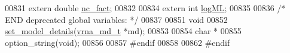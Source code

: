 \begin{DoxyCode}
00831 \textcolor{keyword}{extern} \textcolor{keywordtype}{double} \hyperlink{group__model__details_abcf568e6124bfcb2f847ff4eb0dfded6}{nc\_fact};
00832 
00834 \textcolor{keyword}{extern}  \textcolor{keywordtype}{int} \hyperlink{group__model__details_ae259f89a94acae0c7f1412603e7f57b5}{logML};
00835 
00836 \textcolor{comment}{/* END deprecated global variables: */}
00837 
00851 \textcolor{keywordtype}{void}
00852 \hyperlink{group__model__details_gabad896c3650d420f3f3ddefc69e2bceb}{set\_model\_details}(\hyperlink{group__model__details_structvrna__md__s}{vrna\_md\_t} *md);
00853 
00854 \textcolor{keywordtype}{char} *
00855 option\_string(\textcolor{keywordtype}{void});
00856 
00857 \textcolor{preprocessor}{#endif}
00858 
00862 \textcolor{preprocessor}{#endif}
\end{DoxyCode}
